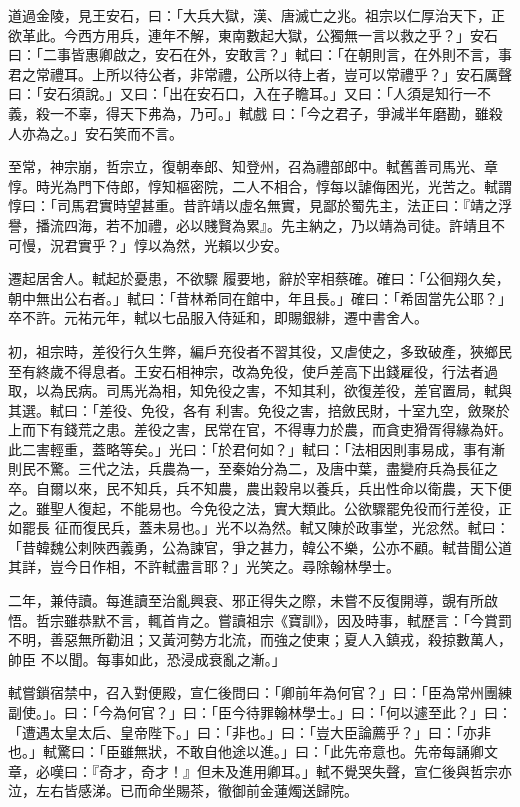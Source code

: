 \begin{pinyinscope}
 道過金陵，見王安石，曰：「大兵大獄，漢、唐滅亡之兆。祖宗以仁厚治天下，正欲革此。今西方用兵，連年不解，東南數起大獄，公獨無一言以救之乎？」安石曰：「二事皆惠卿啟之，安石在外，安敢言？」軾曰：「在朝則言，在外則不言，事君之常禮耳。上所以待公者，非常禮，公所以待上者，豈可以常禮乎？」安石厲聲曰：「安石須說。」又曰：「出在安石口，入在子瞻耳。」又曰：「人須是知行一不義，殺一不辜，得天下弗為，乃可。」軾戲
 曰：「今之君子，爭減半年磨勘，雖殺人亦為之。」安石笑而不言。



 至常，神宗崩，哲宗立，復朝奉郎、知登州，召為禮部郎中。軾舊善司馬光、章惇。時光為門下侍郎，惇知樞密院，二人不相合，惇每以謔侮困光，光苦之。軾謂惇曰：「司馬君實時望甚重。昔許靖以虛名無實，見鄙於蜀先主，法正曰：『靖之浮譽，播流四海，若不加禮，必以賤賢為累』。先主納之，乃以靖為司徒。許靖且不可慢，況君實乎？」惇以為然，光賴以少安。



 遷起居舍人。軾起於憂患，不欲驟
 履要地，辭於宰相蔡確。確曰：「公徊翔久矣，朝中無出公右者。」軾曰：「昔林希同在館中，年且長。」確曰：「希固當先公耶？」卒不許。元祐元年，軾以七品服入侍延和，即賜銀緋，遷中書舍人。



 初，祖宗時，差役行久生弊，編戶充役者不習其役，又虐使之，多致破產，狹鄉民至有終歲不得息者。王安石相神宗，改為免役，使戶差高下出錢雇役，行法者過取，以為民病。司馬光為相，知免役之害，不知其利，欲復差役，差官置局，軾與其選。軾曰：「差役、免役，各有
 利害。免役之害，掊斂民財，十室九空，斂聚於上而下有錢荒之患。差役之害，民常在官，不得專力於農，而貪吏猾胥得緣為奸。此二害輕重，蓋略等矣。」光曰：「於君何如？」軾曰：「法相因則事易成，事有漸則民不驚。三代之法，兵農為一，至秦始分為二，及唐中葉，盡變府兵為長征之卒。自爾以來，民不知兵，兵不知農，農出穀帛以養兵，兵出性命以衛農，天下便之。雖聖人復起，不能易也。今免役之法，實大類此。公欲驟罷免役而行差役，正如罷長
 征而復民兵，蓋未易也。」光不以為然。軾又陳於政事堂，光忿然。軾曰：「昔韓魏公刺陜西義勇，公為諫官，爭之甚力，韓公不樂，公亦不顧。軾昔聞公道其詳，豈今日作相，不許軾盡言耶？」光笑之。尋除翰林學士。



 二年，兼侍讀。每進讀至治亂興衰、邪正得失之際，未嘗不反復開導，覬有所啟悟。哲宗雖恭默不言，輒首肯之。嘗讀祖宗《寶訓》，因及時事，軾歷言：「今賞罰不明，善惡無所勸沮；又黃河勢方北流，而強之使東；夏人入鎮戎，殺掠數萬人，帥臣
 不以聞。每事如此，恐浸成衰亂之漸。」



 軾嘗鎖宿禁中，召入對便殿，宣仁後問曰：「卿前年為何官？」曰：「臣為常州團練副使。」。曰：「今為何官？」曰：「臣今待罪翰林學士。」曰：「何以遽至此？」曰：「遭遇太皇太后、皇帝陛下。」曰：「非也。」曰：「豈大臣論薦乎？」曰：「亦非也。」軾驚曰：「臣雖無狀，不敢自他途以進。」曰：「此先帝意也。先帝每誦卿文章，必嘆曰：『奇才，奇才！』但未及進用卿耳。」軾不覺哭失聲，宣仁後與哲宗亦泣，左右皆感涕。已而命坐賜茶，徹御前金蓮燭送歸院。




\end{pinyinscope}

